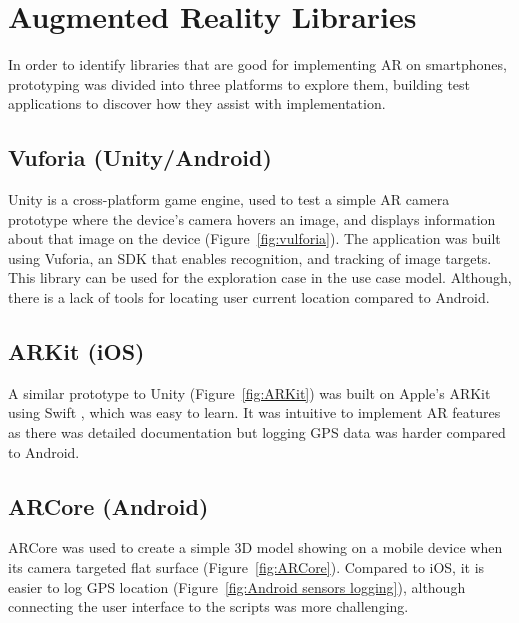 
\section{Augmented Reality Libraries}
In order to identify libraries that are good for implementing AR on smartphones, prototyping was divided into three platforms to explore them, building test applications to discover how they assist with implementation.

\subsection*{Vuforia (Unity/Android)}
Unity is a cross-platform game engine, used to test a simple AR camera prototype where the device's camera hovers an image, and displays information about that image on the device (Figure~\ref{fig:vulforia}). The application was built using Vuforia, an SDK that enables recognition, and tracking of image targets. This library can be used for the exploration case in the use case model. Although, there is a lack of tools for locating user current location compared to Android.

\subsection*{ARKit (iOS)}
A similar prototype to Unity (Figure~\ref{fig:ARKit}) was built on Apple's ARKit using Swift \cite{applear}, which was easy to learn. It was intuitive to implement AR features as there was detailed documentation but logging GPS data was harder compared to Android.

\subsection*{ARCore (Android)}
ARCore was used to create a simple 3D model showing on a mobile device when its camera targeted flat surface (Figure~\ref{fig:ARCore}). Compared to iOS, it is easier to log GPS location (Figure~\ref{fig:Android sensors logging}), although connecting the user interface to the scripts was more challenging.

